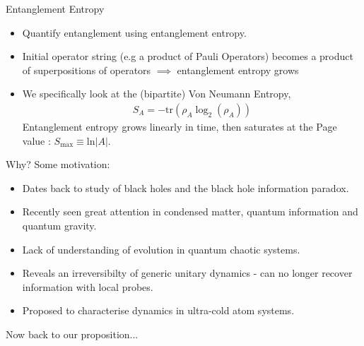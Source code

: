\begin{frame}{Entanglement Entropy}
  \begin{itemize}
    \item Quantify entanglement using entanglement entropy. 
    \item Initial operator string (e.g a product of Pauli Operators) becomes a product of superpositions of operators $\implies$ entanglement entropy grows
    \item We specifically look at the (bipartite) Von Neumann Entropy, 
    \begin{align*}
      S_A = - \text{tr}(\rho_A\log_2(\rho_A))
    \end{align*}
    Entanglement entropy grows linearly in time, then saturates at the Page value \cite{Page_1993}: $S_{\text{max}} \equiv \text{ln}|A|$.   
  \end{itemize}
  

 

  
\end{frame}

\begin{frame}{Why?}
  Some motivation:
  \begin{itemize}
    \item Dates back to study of black holes and the black hole information paradox.
    \item Recently seen great attention in condensed matter, quantum information and quantum gravity.
    \item Lack of understanding of evolution in quantum chaotic systems.
    \item Reveals an irreversibilty of generic unitary dynamics - can no longer recover information with local probes.
    \item Proposed to characterise dynamics in ultra-cold atom systems.
  \end{itemize}

  Now back to our proposition...
\end{frame}

